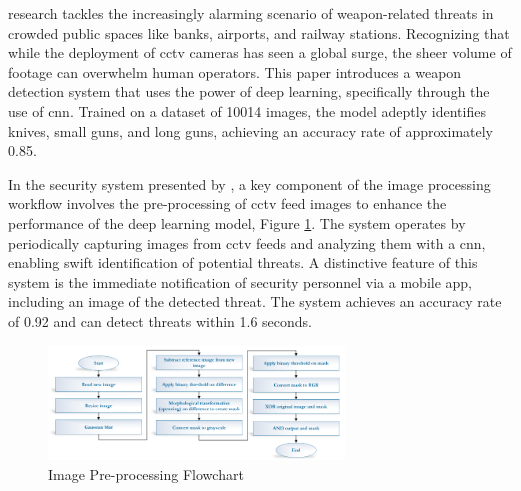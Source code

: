 \citet{rfc6} research tackles the increasingly alarming scenario of weapon-related threats in crowded public spaces like banks, airports, and railway stations. Recognizing that while the deployment of \ac{cctv} cameras has seen a global surge, the sheer volume of footage can overwhelm human operators. This paper introduces a weapon detection system that uses the power of deep learning, specifically through the use of \ac{cnn}. Trained on a dataset of 10014 images, the model adeptly identifies knives, small guns, and long guns, achieving an accuracy rate of approximately 0.85.

In the security system presented by \citet{rfc19}, a key component of the image processing workflow involves the pre-processing of \ac{cctv} feed images to enhance the performance of the deep learning model, Figure \ref{fig:al-mousa-flow}. The system operates by periodically capturing images from \ac{cctv} feeds and analyzing them with a \ac{cnn}, enabling swift identification of potential threats. A distinctive feature of this system is the immediate notification of security personnel via a mobile app, including an image of the detected threat. The system achieves an accuracy rate of 0.92 and can detect threats within 1.6 seconds.

\begin{figure}[h]
    \centering 
    \includegraphics[width=0.7\textwidth]{figs/al-mousa-flowchart.png} 
    \caption{\citet{rfc19} Image Pre-processing Flowchart}
    \label{fig:al-mousa-flow}
\end{figure}

